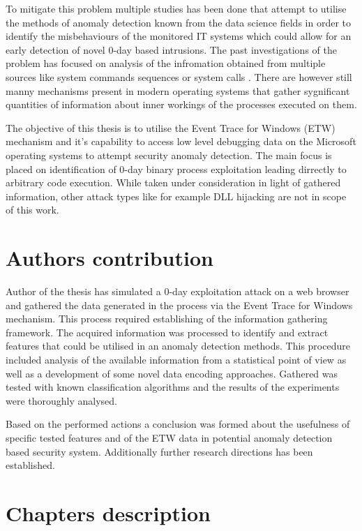 \documentclass[a4paper,twoside,12pt]{book}
\begin{document}
To mitigate this problem multiple studies has been done that attempt to utilise the methods of
anomaly detection known from the data science fields in order to identify the misbehaviours of 
the monitored IT systems which could allow for an early detection of novel 0-day based intrusions.
The past investigations of the problem has focused on analysis of the infromation obtained from 
multiple sources like system commands sequences \cite{bib:lane1997application} or system calls 
\cite{bib:rsvm}. There are however still manny mechanisms present in modern operating systems 
that gather sygnificant quantities of information about inner workings of the processes executed
on them. 

The objective of this thesis is to utilise the Event Trace for Windows (ETW) mechanism and it's 
capability to access low level debugging data on the Microsoft operating systems to attempt
security anomaly detection. The main focus is placed on identification of 0-day binary process 
exploitation leading dirrectly to arbitrary code execution. While taken under consideration in
light of gathered information, other attack types like for example DLL hijacking are not in 
scope of this work.

\section{Authors contribution}

Author of the thesis has simulated a 0-day exploitation attack on a web browser and gathered 
the data generated in the process via the Event Trace for Windows mechanism. This process 
required establishing of the information gathering framework. The acquired 
information was processed to identify and extract features that could be utilised in an anomaly detection
methods. This procedure included analysis of the available information from a statistical point of view
as well as a development of some novel data encoding approaches. Gathered 
was tested with known classification algorithms and the results of the experiments were thoroughly analysed.

Based on the performed actions a conclusion was formed about the usefulness of specific tested features 
and of the ETW data
in potential anomaly detection based security system. Additionally further research directions
has been established.

\section{Chapters description}
\end{document}
